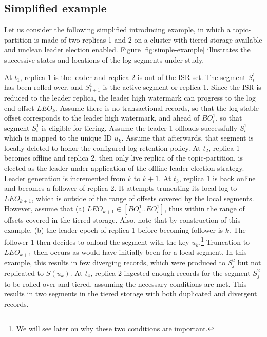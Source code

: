 \documentclass{article}
\begin{document}
\subsection{Simplified example}

Let us consider the following simplified introducing example, in which a topic-partition is made of two replicas 1 and 2 on a cluster with tiered storage available and unclean leader election enabled. Figure \ref{fig:simple-example} illustrates the successive states and locations of the log segments under study.

\begin{outline}[enumerate]
	\1 At $t_1$, replica 1 is the leader and replica 2 is out of the ISR set. The segment $S_i^1$ has been rolled over, and $S_{i+1}^1$ is the active segment or replica 1. Since the ISR is reduced to the leader replica, the leader high watermark can progress to the log end offset $LEO_k$. Assume there is no transactional records, so that the log stable offset corresponds to the leader high watermark, and ahead of $BO_i^1$, so that segment $S_i^1$ is eligible for tiering. Assume the leader 1 offloads successfully $S_i^1$ which is mapped to the unique ID $u_k$. Assume that afterwards, that segment is locally deleted to honor the configured log retention policy.
	\1  At $t_2$, replica 1 becomes offline and replica 2, then only live replica of the topic-partition, is elected as the leader under application of the offline leader election strategy. Leader generation is incremented from $k$ to $k + 1$.
	\1  At $t_3$, replica 1 is back online and becomes a follower of replica 2. It attempts truncating its local log to $LEO_{k+1}$, which is outside of the range of offsets covered by the local segments. However, assume that (a) $LEO_{k+1} \in [BO_i^1..EO_i^1]$, thus within the range of offsets covered in the tiered storage. Also, note that by construction of this example, (b) the leader epoch of replica 1 before becoming follower is $k$. The follower 1 then decides to onload the segment with the key $u_k$.\footnote{We will see later on why these two conditions are important.} Truncation to $LEO_{k+1}$ then occurs as would have initially been for a local segment. In this example, this results in few diverging records, which were produced to $S_j^2$ but not replicated to $S(u_k)$.
	\1 At $t_4$, replica 2 ingested enough records for the segment $S_j^2$ to be rolled-over and tiered, assuming the necessary conditions are met. This results in two segments in the tiered storage with both duplicated and divergent records.
\end{outline}
\end{document}
